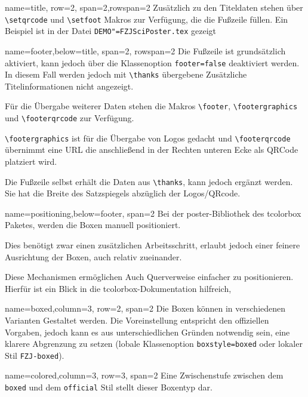 \documentclass[
	accentcolor=9c,
	logofile=example-image, %
	]{fzjsciposter}
\newcommand{\tbs}{\textbackslash}
\let\code\texttt
\newcommand*{\macro}[1]{\code{\tbs#1}}
\let\file\texttt
\let\pck\textsf
\begin{document}
\begin{tcbposter}[
	poster={
		columns=4,
		rows=7,
		spacing=1cm,
	},]
\begin{posterboxenv}[title=Titelei]{name=title, row=2, span=2,rowspan=2}
	Zusätzlich zu den Titeldaten stehen über \macro{setqrcode} und \macro{setfoot} Makros zur Verfügung, die die Fußzeile füllen.
	Ein Beispiel ist in der Datei \file{DEMO"=FZJSciPoster.tex} gezeigt
\end{posterboxenv}
	
\begin{posterboxenv}[title=Fußzeile]{name=footer,below=title, span=2, rowspan=2 }
	Die Fußzeile ist grundsätzlich aktiviert, kann jedoch über die Klassenoption \code{footer=false} deaktiviert werden. In diesem Fall werden jedoch mit \macro{thanks} übergebene Zusätzliche Titelinformationen nicht angezeigt.
	
	Für die Übergabe weiterer Daten stehen die Makros \macro{footer}, \macro{footergraphics} und \macro{footerqrcode} zur Verfügung.
	
	\macro{footergraphics} ist für die Übergabe von Logos gedacht und \macro{footerqrcode} übernimmt eine URL die anschließend in der Rechten unteren Ecke als QRCode platziert wird.
	
	Die Fußzeile selbst erhält die Daten aus \macro{thanks}, kann jedoch ergänzt werden. Sie hat die Breite des Satzspiegels abzüglich der Logos/QRcode.
\end{posterboxenv}
	

\begin{posterboxenv}[title=Platzierung der Boxen]{name=positioning,below=footer, span=2}
	Bei der \pck{poster}-Bibliothek des \pck{tcolorbox} Paketes, werden die Boxen manuell positioniert. 
	
	Dies benötigt zwar einen zusätzlichen Arbeitsschritt, erlaubt jedoch einer feinere Ausrichtung der Boxen, auch relativ zueinander. 
	
	Diese Mechanismen ermöglichen Auch Querverweise einfacher zu positionieren. Hierfür ist ein Blick in die \pck{tcolorbox}-Dokumentation hilfreich,
\end{posterboxenv}

\begin{posterboxenv}[title=Eine Box im Stil FZJ-boxed, FZJ-boxed]{name=boxed,column=3, row=2, span=2}
	Die Boxen können in verschiedenen Varianten Gestaltet werden. Die Voreinstellung entspricht den offiziellen Vorgaben, jedoch kann es aus unterschiedlichen Gründen notwendig sein, eine klarere Abgrenzung zu setzen (lobale Klassenoption \code{boxstyle=boxed} oder lokaler Stil \code{FZJ-boxed}).
\end{posterboxenv}


\begin{posterboxenv}[title=Eine Box im Stil FZJ-colored, FZJ-colored]{name=colored,column=3, row=3, span=2}
	Eine Zwischenstufe zwischen dem \code{boxed} und dem \code{official} Stil stellt dieser Boxentyp dar.
	

\end{posterboxenv}
\end{tcbposter}
\end{document}
